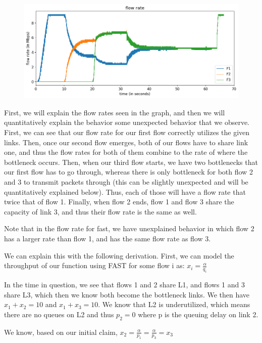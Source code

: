 \documentclass{article}
\begin{document}
\begin{figure}[H]
\centering
\includegraphics[width = \textwidth]{"test_case2_fast flow rate"}
\end{figure}

First, we will explain the flow rates seen in the graph, and then we will quantitatively explain the behavior some unexpected behavior that we observe. First, we can see that our flow rate for our first flow correctly utilizes the given links. Then, once our second flow emerges, both of our flows have to share link one, and thus the flow rates for both of them combine to the rate of where the bottleneck occurs. Then, when our third flow starts, we have two bottlenecks that our first flow has to go through, whereas there is only bottleneck for both flow 2 and 3 to transmit packets through (this can be slightly unexpected and will be quantitatively explained below). Thus, each of those will have a flow rate that twice that of flow 1. Finally, when flow 2 ends, flow 1 and flow 3 share the capacity of link 3, and thus their flow rate is the same as well. 

Note that in the flow rate for fast, we have unexplained behavior in which flow 2 has a larger rate than flow 1, and has the same flow rate as flow 3. 

We can explain this with the following derivation. First, we can model the throughput of our function using FAST for some flow i as: $ x_i = \frac{\alpha}{q_i} $

In the time in question, we see that flows 1 and 2 share L1, and flows 1 and 3 share L3, which then we know both become the bottleneck links. We then have $x_1 + x_2 = 10 $ and $x_1 + x_3 = 10 $. We know that L2 is underutilized, which means there are no queues on L2 and thus $p_2 = 0 $ where p is the queuing delay on link 2.

We know, based on our initial claim, $ x_2 = \frac{\alpha}{p_1} = \frac{\alpha}{p_3}  = x_3$
\end{document}
